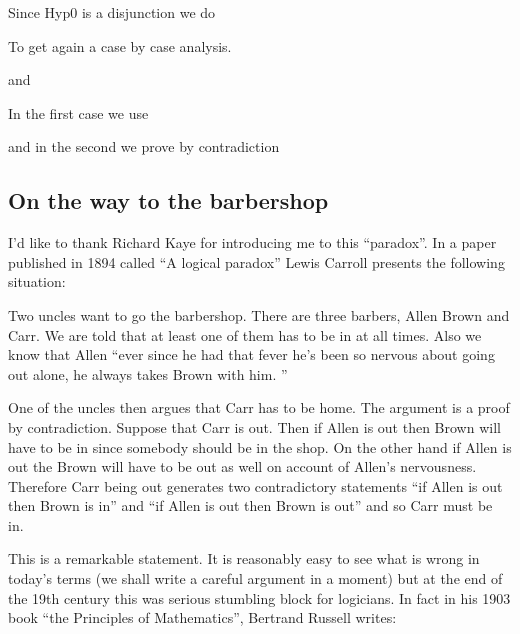 Since Hyp0 is a disjunction we do

To get again a case by case analysis.


and


In the first case we use


and in the second we prove by contradiction

\subsection{On the way to the barbershop }

I'd like to thank Richard Kaye for introducing me to this ``paradox''.  In a paper published in 1894 called ``A logical paradox'' Lewis Carroll presents the following situation:

Two uncles want to go the barbershop. There are three barbers, Allen Brown and Carr. We are told that at least one of them has to be in at all times. Also we know that Allen  ``ever since he had that fever he's been so nervous about going out alone, he always takes Brown with him. '' 

One of the uncles then argues that Carr has to be home. The argument is a proof by contradiction. Suppose that Carr is out.  Then if Allen is out then Brown will have to be in since somebody should be in the shop. On the other hand if Allen is out the Brown will have to be out as well on account of Allen's nervousness. Therefore Carr being out generates two contradictory statements ``if Allen is out then Brown is in'' and ``if Allen is out then Brown is out'' and so Carr must be in.

This is a remarkable statement. It is reasonably easy to see what is wrong in today's terms (we shall write a careful argument in a moment) but  at the end of the 19th century  this was serious stumbling block for logicians. In fact in his 1903 book  ``the Principles of Mathematics'', Bertrand  Russell writes:

